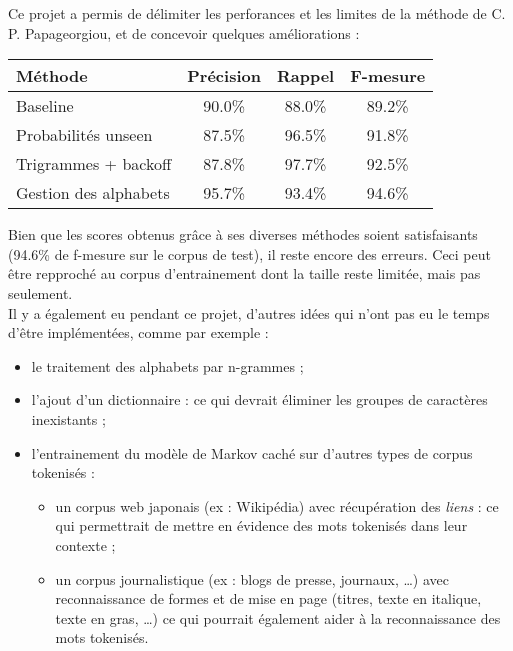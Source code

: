 
Ce projet a permis de délimiter les perforances et les limites de la méthode de C. P. Papageorgiou, et de concevoir quelques améliorations :
\begin{center}
	\begin{tabular}{|l c c c|}
	  	\hline
	  	\textbf{Méthode} & \textbf{Précision} & \textbf{Rappel} & \textbf{F-mesure}\\
	  	\hline
	  	Baseline & 90.0\% & 88.0\% & 89.2\% \\
		Probabilités unseen & 87.5\% & 96.5\% & 91.8\% \\
		Trigrammes + backoff & 87.8\% & 97.7\% & 92.5\% \\
		Gestion des alphabets & 95.7\% & 93.4\% & 94.6\% \\
	  	\hline
	\end{tabular}
\end{center}
\vspace{0.3cm}

Bien que les scores obtenus grâce à ses diverses méthodes soient satisfaisants (94.6\% de f-mesure sur le corpus
de test), il reste encore des erreurs. Ceci peut être repproché au corpus d'entrainement dont la taille reste limitée, mais pas seulement.\\

Il y a également eu pendant ce projet, d'autres idées qui n'ont pas eu le temps d'être implémentées, comme par exemple :
\begin{itemize}
	\item le traitement des alphabets par n-grammes ;
	\item l'ajout d'un dictionnaire : ce qui devrait éliminer les groupes de caractères inexistants ;
	\item l'entrainement du modèle de Markov caché sur d'autres types de corpus tokenisés :
	\begin{itemize}
		\item un corpus web japonais (ex : Wikipédia) avec récupération des \textit{liens} : ce qui permettrait de mettre en évidence des mots tokenisés dans leur contexte ;
		\item un corpus journalistique (ex : blogs de presse, journaux, \dots) avec reconnaissance de formes et de mise en page (titres, texte en italique, texte en gras, \dots ) ce qui pourrait également aider à la reconnaissance des mots tokenisés.
		\end{itemize}
\end{itemize}
